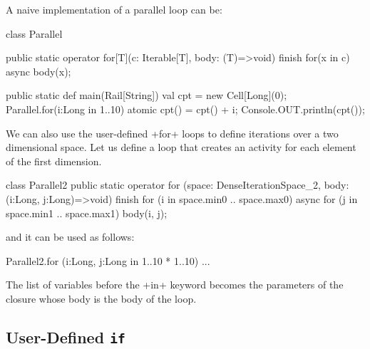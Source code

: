 \begin{ex}
  A naive implementation of a parallel loop can be:
\begin{xten}
class Parallel {

  public static operator for[T](c: Iterable[T], body: (T)=>void) {
    finish {
      for(x in c) {
        async { body(x); }
      }
    }
  }

  public static def main(Rail[String]) {
    val cpt = new Cell[Long](0);
    Parallel.for(i:Long in 1..10) {
      atomic { cpt() = cpt() + i; }
    }
    Console.OUT.println(cpt());
  }
}
\end{xten}
\end{ex}

\begin{ex}
  We can also use the user-defined \xcd+for+ loops to define
  iterations over a two dimensional space. Let us define a loop that
  creates an activity for each element of the first dimension.
\begin{xten}
class Parallel2 {
  public static operator for (space: DenseIterationSpace_2,
                              body: (i:Long, j:Long)=>void) {
    finish {
      for (i in space.min0 .. space.max0) {
        async for (j in space.min1 .. space.max1) {
          body(i, j);
        }
      }
    }
  }
}
\end{xten}
and it can be used as follows:
\begin{xten}
Parallel2.for (i:Long, j:Long in 1..10 * 1..10) { ... }
\end{xten}
The list of variables before the \xcd+in+ keyword becomes the
parameters of the closure whose body is the body of the loop.
\end{ex}

\subsection{User-Defined \texttt{if}}

